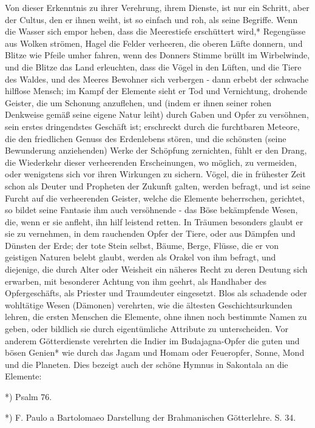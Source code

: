 \documentclass[a4paper, 11pt, oneside, polutonikogreek, german]{article}
\begin{document}
Von dieser Erkenntnis zu ihrer Verehrung, ihrem Dienste, ist nur ein Schritt, aber der Cultus, den er ihnen weiht, ist so einfach und roh, als seine Begriffe. Wenn die Wasser sich empor heben, dass die Meerestiefe erschüttert wird,* Regengüsse aus Wolken strömen, Hagel die Felder verheeren, die oberen Lüfte donnern, und Blitze wie Pfeile umher fahren, wenn des Donners Stimme brüllt im Wirbelwinde, und die Blitze das Land erleuchten, dass die Vögel in den Lüften, und die Tiere des Waldes, und des Meeres Bewohner sich verbergen - dann erbebt der schwache hilflose Mensch; im Kampf der Elemente sieht er Tod und Vernichtung, drohende Geister, die um Schonung anzuflehen, und (indem er ihnen seiner rohen Denkweise gemäß seine eigene Natur leiht) durch Gaben und Opfer zu versöhnen, sein erstes dringendstes Geschäft ist; erschreckt durch die furchtbaren Meteore, die den friedlichen Genuss des Erdenlebens stören, und die schönsten (seine Bewunderung anziehenden) Werke der Schöpfung zernichten, fühlt er den Drang, die Wiederkehr dieser verheerenden Erscheinungen, wo möglich, zu vermeiden, oder wenigstens sich vor ihren Wirkungen zu sichern. Vögel, die in frühester Zeit schon als Deuter und Propheten der Zukunft galten, werden befragt, und ist seine Furcht auf die verheerenden Geister, welche die Elemente beherrschen, gerichtet, so bildet seine Fantasie ihm auch versöhnende - das Böse bekämpfende Wesen, die, wenn er sie anfleht, ihn hilf leistend retten. In Träumen besonders glaubt er sie zu vernehmen, in dem rauchenden Opfer der Tiere, oder aus Dämpfen und Dünsten der Erde; der tote Stein selbst, Bäume, Berge, Flüsse, die er von geistigen Naturen belebt glaubt, werden als Orakel von ihm befragt, und diejenige, die durch Alter oder Weisheit ein näheres Recht zu deren Deutung sich erwarben, mit besonderer Achtung von ihm geehrt, als Handhaber des Opfergeschäfts, als Priester und Traumdeuter eingesetzt. Blos als schadende oder wohltätige Wesen (Dämonen) verehrten, wie die ältesten Geschichtsurkunden lehren, die ersten Menschen die Elemente, ohne ihnen noch bestimmte Namen zu geben, oder bildlich sie durch eigentümliche Attribute zu unterscheiden. Vor anderem Götterdienste verehrten die Indier im Budajagna-Opfer die guten und bösen Genien* wie durch das Jagam und Homam oder Feueropfer, Sonne, Mond und die Planeten. Dies bezeigt auch der schöne Hymnus in Sakontala an die Elemente:

*) Psalm 76.

*) F. Paulo a Bartolomaeo Darstellung der Brahmanischen Götterlehre. S. 34.
\end{document}
